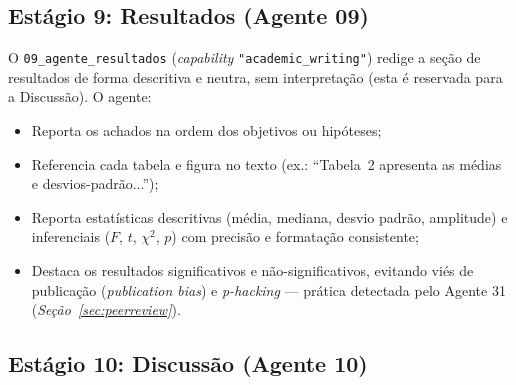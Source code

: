 
\subsection{Estágio 9: Resultados (Agente 09)}
\label{sec:estagio9}

O \texttt{09\_agente\_resultados}
(\textit{capability} \texttt{"academic\_writing"}) redige a seção
de resultados de forma descritiva e neutra, sem interpretação (esta
é reservada para a Discussão). O agente:

\begin{itemize}
    \item Reporta os achados na ordem dos objetivos ou hipóteses;

    \item Referencia cada tabela e figura no texto
    (ex.: ``Tabela~2 apresenta as médias e desvios-padrão...'');

    \item Reporta estatísticas descritivas (média, mediana, desvio
    padrão, amplitude) e inferenciais ($F$, $t$, $\chi^2$, $p$) com
    precisão e formatação consistente;

    \item Destaca os resultados significativos e não-significativos,
    evitando viés de publicação (\textit{publication bias}) e
    \textit{p-hacking} — prática detectada pelo Agente 31
    (\textit{Seção~\ref{sec:peerreview}}).
\end{itemize}

\subsection{Estágio 10: Discussão (Agente 10)}
\label{sec:estagio10}


